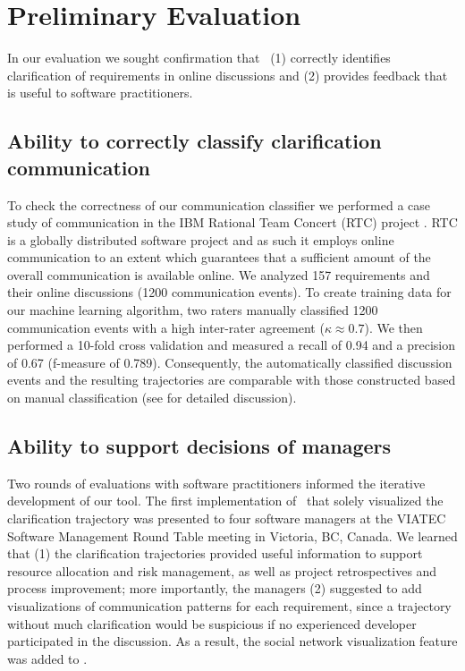 \section{Preliminary Evaluation}
In our evaluation we sought confirmation that \viss\ (1) correctly identifies clarification of requirements in online discussions and (2) provides feedback that is useful to software practitioners. 

\subsection{Ability to correctly classify clarification communication}
To check the correctness of our communication classifier we performed a case study of communication in the IBM Rational Team Concert (RTC) project \cite{Knauss2012f}. 
RTC is a globally distributed software project and as such it employs online communication to an extent which guarantees that a sufficient amount of the overall communication is available online.
%
%
We analyzed 157 requirements and their online discussions (1200 communication events). 
To create training data for our machine learning algorithm, two raters manually classified 1200 communication events with a high inter-rater agreement ($\kappa \approx 0.7$).  
We then performed a 10-fold cross validation and measured a recall of 0.94 and a precision of  0.67 (f-measure of 0.789). 
Consequently, the automatically classified discussion events and the resulting trajectories are comparable with those constructed based on manual classification (see \cite{Knauss2012f} for detailed discussion).

\subsection{Ability to support decisions of managers}
Two rounds of evaluations with software practitioners informed the iterative development of our tool. 
The first implementation of \viss\ that solely visualized the clarification trajectory was presented to four software managers at the VIATEC Software Management Round Table meeting in Victoria, BC, Canada. 
We learned that (1) the clarification trajectories provided useful information to support resource allocation and risk management, as well as project retrospectives and process improvement; more importantly, the managers (2) suggested to add visualizations of communication patterns for each requirement, since a trajectory without much clarification would be suspicious if no experienced developer participated in the discussion. 
As a result, the social network visualization feature was added to \viss. 

